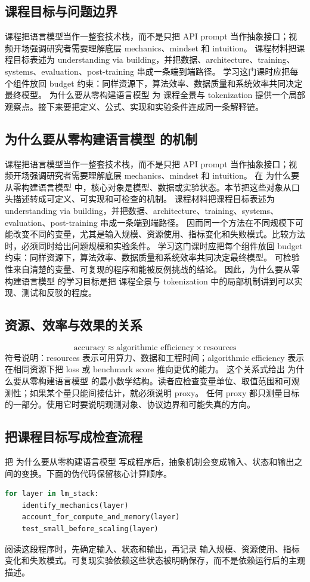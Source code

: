 \documentclass[a4paper]{article}
\begin{document}
\subsection{课程目标与问题边界}
课程把语言模型当作一整套技术栈，而不是只把 API prompt 当作抽象接口；视频开场强调研究者需要理解底层 mechanics、mindset 和 intuition。
课程材料把课程目标表述为 understanding via building，并把数据、architecture、training、systems、evaluation、post-training 串成一条端到端路径。
学习这门课时应把每个组件放回 budget 约束：同样资源下，算法效率、数据质量和系统效率共同决定最终模型。
为什么要从零构建语言模型 为 课程全景与 tokenization 提供一个局部观察点。接下来要把定义、公式、实现和实验条件连成同一条解释链。
\subsection{为什么要从零构建语言模型 的机制}
课程把语言模型当作一整套技术栈，而不是只把 API prompt 当作抽象接口；视频开场强调研究者需要理解底层 mechanics、mindset 和 intuition。 在 为什么要从零构建语言模型 中，核心对象是模型、数据或实验状态。本节把这些对象从口头描述转成可定义、可实现和可检查的机制。
课程材料把课程目标表述为 understanding via building，并把数据、architecture、training、systems、evaluation、post-training 串成一条端到端路径。 因而同一个方法在不同规模下可能改变不同的变量，尤其是输入规模、资源使用、指标变化和失败模式。比较方法时，必须同时给出问题规模和实验条件。
学习这门课时应把每个组件放回 budget 约束：同样资源下，算法效率、数据质量和系统效率共同决定最终模型。 可检验性来自清楚的变量、可复现的程序和能被反例挑战的结论。
因此，为什么要从零构建语言模型 的学习目标是把 课程全景与 tokenization 中的局部机制讲到可以实现、测试和反驳的程度。
\subsection{资源、效率与效果的关系}
\[\text{accuracy} \approx \text{algorithmic efficiency} \times \text{resources}\]
符号说明：resources 表示可用算力、数据和工程时间；algorithmic efficiency 表示在相同资源下把 loss 或 benchmark score 推向更优的能力。
这个关系式给出 为什么要从零构建语言模型 的最小数学结构。读者应检查变量单位、取值范围和可观测性；如果某个量只能间接估计，就必须说明 proxy。
任何 proxy 都只测量目标的一部分。使用它时要说明观测对象、协议边界和可能失真的方向。
\subsection{把课程目标写成检查流程}
把 为什么要从零构建语言模型 写成程序后，抽象机制会变成输入、状态和输出之间的变换。下面的伪代码保留核心计算顺序。
\begin{lstlisting}[language=Python]
for layer in lm_stack:
    identify_mechanics(layer)
    account_for_compute_and_memory(layer)
    test_small_before_scaling(layer)
\end{lstlisting}
阅读这段程序时，先确定输入、状态和输出，再记录 输入规模、资源使用、指标变化和失败模式。可复现实验依赖这些状态被明确保存，而不是依赖运行后的主观描述。
\end{document}
